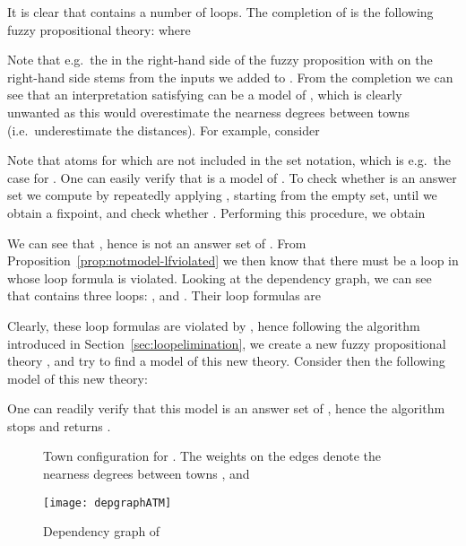 \documentclass{tlp}
\begin{document}
It is clear that  contains a number of loops. The completion of  is the following fuzzy propositional theory:
{\allowdisplaybreaks }
where 

Note that e.g.~the  in the right-hand side of the fuzzy proposition with  on the right-hand side stems from the inputs  we added to .
From the completion  we can see that an interpretation  satisfying  can be a model of , which is clearly unwanted as this would overestimate the nearness degrees between towns (i.e.~underestimate the distances). For example, consider 





Note that atoms  for which  are not included in the set notation, which is e.g.~the case for . One can easily verify that  is a model of .
To check whether  is an answer set we compute  by repeatedly applying , starting from the empty set, until we obtain a fixpoint, and check whether . Performing this procedure, we obtain



We can see that , hence  is not an answer set of .
From Proposition~\ref{prop:notmodel-lfviolated} we then know that there must be a loop in  whose loop formula is violated. Looking at the dependency graph, we can see that  contains three loops: ,  and . Their loop formulas are
 
 Clearly, these loop formulas are violated by , hence following the algorithm introduced in
Section~\ref{sec:loopelimination}, we create a new fuzzy propositional theory , and try to
find a model of this new theory. Consider then the following model of this new theory:



One can readily verify that this model is an answer set of , hence the algorithm stops
and returns .

\begin{figure}
 \centering
{}
 \caption{Town configuration for . The weights on the edges denote the nearness degrees between towns ,  and }
 \label{fig:atm}
\end{figure}

\begin{figure}
 \centering
 \texttt{[image: depgraphATM]}
\caption{Dependency graph of }
 \label{fig:depgraph-atm}
\end{figure}
\end{document}
